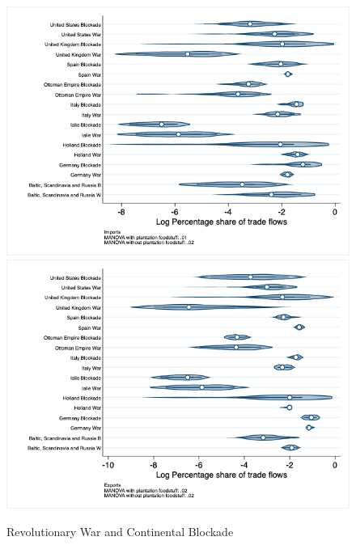 \documentclass[12pt,a4paper,notitlepage,english]{article}
\begin{document}
\begin{appendix}
\begin{figure}[h!]
\centering
\caption{Revolutionary War and Continental Blockade}
\label{rev_block_nat_distr_pays7}
\includegraphics[scale=.4]{rev_block_nat_distr_Ipays7}
\includegraphics[scale=.4]{rev_block_nat_distr_Xpays7}
\end{figure}


\end{appendix}
\end{document}
